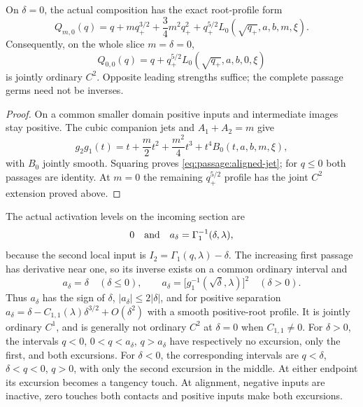 \begin{lemma}
\label{lem:passage:finite-inverse}
On $\delta=0$, the actual composition has the exact root-profile form
\begin{equation}\label{eq:passage:aligned-jet}
 Q_{m,0}(q)=q+mq_+^{3/2}+\frac34m^2q_+^2
                  +q_+^{5/2}L_0(\sqrt{q_+},a,b,m,\xi).
\end{equation}
Consequently, on the whole slice $m=\delta=0$,
\begin{equation}\label{eq:passage:finite-cancellation}
 Q_{0,0}(q)=q+q_+^{5/2}L_0(\sqrt{q_+},a,b,0,\xi)
\end{equation}
is jointly ordinary $C^2$. Opposite leading strengths suffice; the
complete passage germs need not be inverses.
\end{lemma}

\begin{proof}
On a common smaller domain positive inputs and intermediate images stay
positive. The cubic companion jets and $A_1+A_2=m$ give
\[
 g_2g_1(t)=t+\frac m2t^2+\frac{m^2}{4}t^3
                      +t^4B_0(t,a,b,m,\xi),
\]
with $B_0$ jointly smooth. Squaring proves
\eqref{eq:passage:aligned-jet}; for $q\le0$ both passages are identity.
At $m=0$ the remaining $q_+^{5/2}$ profile has the joint $C^2$
extension proved above.
\end{proof}

The actual activation levels on the incoming section are
\begin{equation}\label{eq:passage:true-thresholds}
 0\quad\hbox{and}\quad a_\delta=\Gamma_1^{-1}(\delta,\lambda),
\end{equation}
because the second local input is $I_2=\Gamma_1(q,\lambda)-\delta$.
The increasing first passage has derivative near one, so its inverse
exists on a common ordinary interval and
\begin{equation}\label{eq:passage:threshold-formula}
 a_\delta=\delta\quad(\delta\le0),\qquad
 a_\delta=\bigl[g_1^{-1}(\sqrt\delta,\lambda)\bigr]^2
                                                \quad(\delta>0).
\end{equation}
Thus $a_\delta$ has the sign of $\delta$, $|a_\delta|\le2|\delta|$,
and for positive separation
$a_\delta=\delta-C_{1,1}(\lambda)\delta^{3/2}+O(\delta^2)$ with a
smooth positive-root profile. It is jointly ordinary $C^1$, and is
generally not ordinary $C^2$ at $\delta=0$ when $C_{1,1}\ne0$.
For $\delta>0$, the intervals $q<0$, $0<q<a_\delta$, $q>a_\delta$
have respectively no excursion, only the first, and both excursions.
For $\delta<0$, the corresponding intervals are $q<\delta$,
$\delta<q<0$, $q>0$, with only the second excursion in the middle.
At either endpoint its excursion becomes a tangency touch. At alignment,
negative inputs are inactive, zero touches both contacts and positive
inputs make both excursions.

